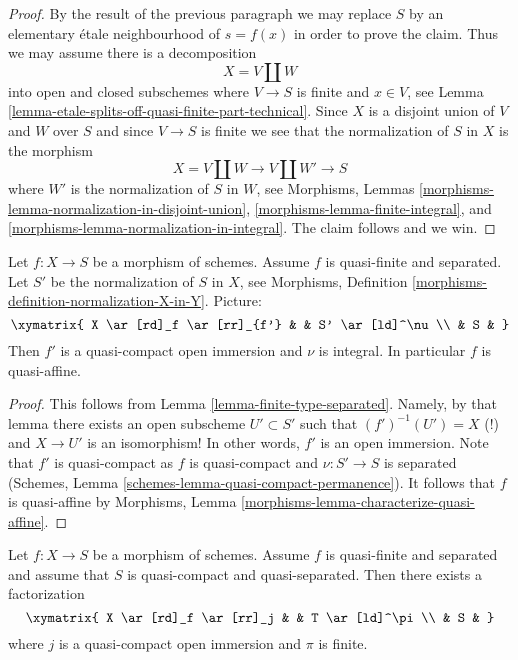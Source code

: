 \begin{proof}
\medskip\noindent
By the result of the previous paragraph we may replace $S$ by an
elementary \'etale neighbourhood of $s = f(x)$ in order to prove the claim.
Thus we may assume there is a decomposition
$$
X = V \amalg W
$$
into open and closed subschemes where $V \to S$ is finite and $x \in V$,
see Lemma \ref{lemma-etale-splits-off-quasi-finite-part-technical}.
Since $X$ is a disjoint union of $V$ and $W$ over $S$ and since
$V \to S$ is finite we see that the
normalization of $S$ in $X$ is the morphism
$$
X = V \amalg W \longrightarrow V \amalg W' \longrightarrow S
$$
where $W'$ is the normalization of $S$ in $W$, see
Morphisms, Lemmas \ref{morphisms-lemma-normalization-in-disjoint-union},
\ref{morphisms-lemma-finite-integral}, and
\ref{morphisms-lemma-normalization-in-integral}.
The claim follows and we win.
\end{proof}

\begin{lemma}
\label{lemma-quasi-finite-separated-quasi-affine}
Let $f : X \to S$ be a morphism of schemes.
Assume $f$ is quasi-finite and separated.
Let $S'$ be the normalization of $S$ in $X$, see
Morphisms, Definition \ref{morphisms-definition-normalization-X-in-Y}.
Picture:
$$
\xymatrix{
X \ar[rd]_f \ar[rr]_{f'} & & S' \ar[ld]^\nu \\
& S &
}
$$
Then $f'$ is a quasi-compact open immersion and $\nu$ is integral.
In particular $f$ is quasi-affine.
\end{lemma}

\begin{proof}
This follows from Lemma \ref{lemma-finite-type-separated}. Namely, by
that lemma there exists an open subscheme $U' \subset S'$ such that
$(f')^{-1}(U') = X$ (!) and $X \to U'$ is an isomorphism! In other
words, $f'$ is an open immersion. Note that $f'$ is quasi-compact as
$f$ is quasi-compact and $\nu : S' \to S$ is separated
(Schemes, Lemma \ref{schemes-lemma-quasi-compact-permanence}).
It follows that $f$ is quasi-affine by
Morphisms, Lemma \ref{morphisms-lemma-characterize-quasi-affine}.
\end{proof}

\begin{lemma}
\label{lemma-quasi-finite-separated-pass-through-finite}
Let $f : X \to S$ be a morphism of schemes.
Assume $f$ is quasi-finite and separated and assume that
$S$ is quasi-compact and quasi-separated. Then there exists
a factorization
$$
\xymatrix{
X \ar[rd]_f \ar[rr]_j & & T \ar[ld]^\pi \\
& S &
}
$$
where $j$ is a quasi-compact open immersion and $\pi$ is finite.
\end{lemma}

